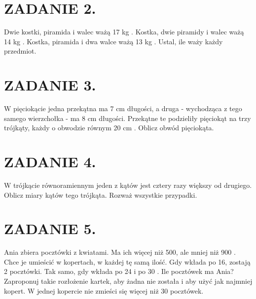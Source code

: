 \documentclass[10pt]{article}
\begin{document}
\section*{ZADANIE 2.}
Dwie kostki, piramida i walec ważą 17 kg . Kostka, dwie piramidy i walec ważą 14 kg . Kostka, piramida i dwa walce ważą 13 kg . Ustal, ile waży każdy przedmiot.

\section*{ZADANIE 3.}
W pięciokącie jedna przekątna ma 7 cm długości, a druga - wychodząca z tego samego wierzchołka - ma 8 cm długości. Przekątne te podzieliły pięciokąt na trzy trójkąty, każdy o obwodzie równym 20 cm . Oblicz obwód pięciokąta.

\section*{ZADANIE 4.}
W trójkącie równoramiennym jeden z kątów jest cztery razy większy od drugiego. Oblicz miary kątów tego trójkąta. Rozważ wszystkie przypadki.

\section*{ZADANIE 5.}
Ania zbiera pocztówki z kwiatami. Ma ich więcej niż 500, ale mniej niż 900 . Chce je umieścić w kopertach, w każdej tę samą ilość. Gdy wkłada po 16, zostają 2 pocztówki. Tak samo, gdy wkłada po 24 i po 30 . Ile pocztówek ma Ania? Zaproponuj takie rozłożenie kartek, aby żadna nie została i aby użyć jak najmniej kopert. W jednej kopercie nie zmieści się więcej niż 30 pocztówek.
\end{document}
